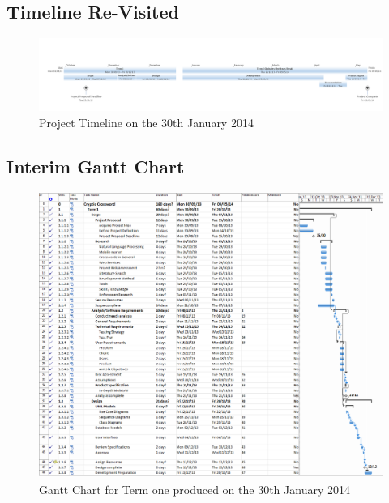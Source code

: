 \begin{landscape}
\subsection{Timeline Re-Visited}

\begin{figure}[H]
  \centering
  \includegraphics[width=\linewidth]{images/timeline2.png}
  \caption{Project Timeline on the 30th January 2014}
  \label{fig:timeline2}
\end{figure}


\newpage 
\subsection{Interim Gantt Chart}

\begin{figure}[H]
  \centering
  \includegraphics[scale=0.35]{images/gant_chart_interim_term1.png}
  \caption{Gantt Chart for Term one produced on the 30th January 2014}
  \label{fig:ganttinterimterm1}
\end{figure}


\end{landscape}
